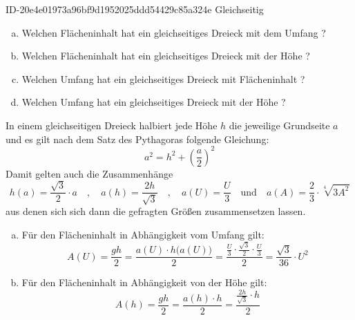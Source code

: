 \begin{exercise}
      {ID-20e4e01973a96bf9d1952025ddd54429c85a324e}
      {Gleichseitig}
  \ifproblem\problem\par
    \begin{enumerate}[a)]
      \squeeze
      \item Welchen Flächeninhalt hat ein gleichseitiges Dreieck mit dem Umfang ?
      \item Welchen Flächeninhalt hat ein gleichseitiges Dreieck mit der Höhe ?
      \item Welchen Umfang hat ein gleichseitiges Dreieck mit Flächeninhalt ?
      \item Welchen Umfang hat ein gleichseitiges Dreieck mit der Höhe ?
    \end{enumerate}
  \fi
  \ifoutline\outline\par
    In einem gleichseitigen Dreieck halbiert jede Höhe $h$ die jeweilige
    Grundseite $a$ und es gilt nach dem Satz des Pythagoras folgende Gleichung:
    \begin{equation*}
      a^2=h^2+\left(\frac{a}{2}\right)^2
    \end{equation*}
    Damit gelten auch die Zusammenhänge
    \begin{equation*}
      h(a)=\frac{\sqrt{3}}{2}\cdot a
      \quad,\quad
      a(h)=\frac{2h}{\sqrt{3}}
      \quad,\quad
      a(U)=\frac{U}{3}
      \quad\text{und}\quad
      a(A)=\frac{2}{3}\cdot\sqrt[4]{3A^2}
    \end{equation*}
    aus denen sich sich dann die gefragten Größen zusammensetzen lassen.
    \begin{enumerate}[a)]
      \item Für den Flächeninhalt in Abhängigkeit vom Umfang gilt:
            \begin{equation*}
              A(U)
              =
              \frac{gh}{2}
              =
              \frac{a(U)\cdot h\big(a(U)\big)}{2}
              =
              \frac{\frac{U}{3}\cdot\frac{\sqrt{3}}{2}\cdot\frac{U}{3}}{2}
              =
              \frac{\sqrt{3}}{36}\cdot U^2
            \end{equation*}
      \item Für den Flächeninhalt in Abhängigkeit von der Höhe gilt:
            \begin{equation*}
              A(h)
              =
              \frac{gh}{2}
              =
              \frac{a(h)\cdot h}{2}
              =
              \frac{\frac{2h}{\sqrt{3}}\cdot h}{2}

\end{equation*}
\end{enumerate}
\end{exercise}
